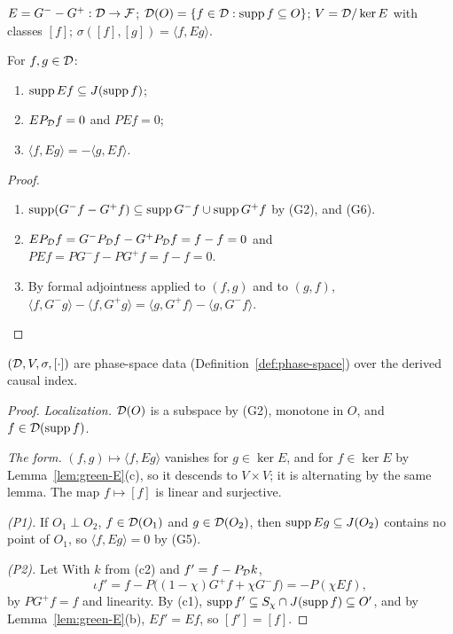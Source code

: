 \begin{definition}\label{def:green-phase}
 $E=G^--G^+:\mathcal D\to\mathcal F$; $\mathcal D(O)=\{f\in\mathcal D:\operatorname{supp} f\subseteq O\}$; $V=\mathcal D/\ker E$ with classes
$[f]$; $\sigma([f],[g])=\langle f,Eg\rangle$.
\end{definition}

\begin{lemma}\label{lem:green-E}
For   $f,g\in\mathcal D$:
\begin{enumerate}[label=(\alph*),leftmargin=2.5em]
\item $\operatorname{supp} Ef\subseteq J(\operatorname{supp} f)$;
\item $EP_\mathcal D f=0$ and $PEf=0$;
\item $\langle f,Eg\rangle=-\langle g,Ef\rangle$.
\end{enumerate}
\end{lemma}
\begin{proof}
\begin{enumerate}[leftmargin=2.5em]
\item[(a)] $\operatorname{supp}(G^-f-G^+f)\subseteq\operatorname{supp} G^-f\cup\operatorname{supp} G^+f$ by (G2), and (G6).
\item[(b)] $EP_\mathcal D f=G^-P_\mathcal D f-G^+P_\mathcal D f=f-f=0$ and $PEf=PG^-f-PG^+f=f-f=0$.
\item[(c)] By formal adjointness applied to $(f,g)$ and to $(g,f)$,
$\langle f,G^-g\rangle-\langle f,G^+g\rangle=\langle g,G^+f\rangle-\langle g,G^-f\rangle$.
\end{enumerate}
\end{proof}

\begin{proposition}\label{prop:green-phase}
 $(\mathcal D,V,\sigma,[\cdot])$  are phase-space data (Definition~\ref{def:phase-space}) over the
derived causal index.
\end{proposition}
\begin{proof}
\emph{Localization.} $\mathcal D(O)$ is a subspace by (G2), monotone in $O$, and $f\in\mathcal D(\operatorname{supp} f)$.

\emph{The form.} $(f,g)\mapsto\langle f,Eg\rangle$ vanishes for $g\in\ker E$, and for $f\in\ker E$
by Lemma~\ref{lem:green-E}(c), so it descends to $V\times V$; it is alternating by the same
lemma. The map $f\mapsto[f]$ is linear and surjective.

\emph{(P1).} If $O_1\perp O_2$, $f\in\mathcal D(O_1)$ and $g\in\mathcal D(O_2)$, then
$\operatorname{supp} Eg\subseteq J(O_2)$ contains no point of $O_1$, so $\langle f,Eg\rangle=0$ by (G5).

\emph{(P2).} Let  With $k$ from (c2) and
$f'=f-P_\mathcal D k$,
\[
\iota f'=f-P\bigl((1-\chi)G^+f+\chi G^-f\bigr)=-P(\chi Ef),
\]
by $PG^+f=f$ and linearity. By (c1), $\operatorname{supp} f'\subseteq S_\chi\cap J(\operatorname{supp} f)\subseteq O'$, and by
Lemma~\ref{lem:green-E}(b), $Ef'=Ef$, so $[f']=[f]$.
\end{proof}

